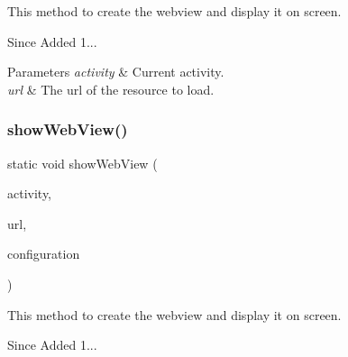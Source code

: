 This method to create the webview and display it on screen. 

\begin{DoxySince}{Since}
Added 1... 
\end{DoxySince}

\begin{DoxyParams}{Parameters}
{\em activity} & Current activity. \\
\hline
{\em url} & The url of the resource to load. \\
\hline
\end{DoxyParams}
\mbox{\label{classcom_1_1toast_1_1android_1_1gamebase_1_1_gamebase_1_1_web_view_acb06909cde1d3338d7a7c852b9b76e76}} 
\subsubsection{\texorpdfstring{show\+Web\+View()}{showWebView()}\hspace{0.1cm}{\footnotesize\ttfamily [2/3]}}
{\footnotesize\ttfamily static void show\+Web\+View (\begin{DoxyParamCaption}\item[{@Non\+Null Activity}]{activity,  }\item[{@Non\+Null String}]{url,  }\item[{@Non\+Null \hyperlink{classcom_1_1toast_1_1android_1_1gamebase_1_1_gamebase_web_view_configuration}{Gamebase\+Web\+View\+Configuration}}]{configuration }\end{DoxyParamCaption})\hspace{0.3cm}{\ttfamily [static]}}



This method to create the webview and display it on screen. 

\begin{DoxySince}{Since}
Added 1... 
\end{DoxySince}

